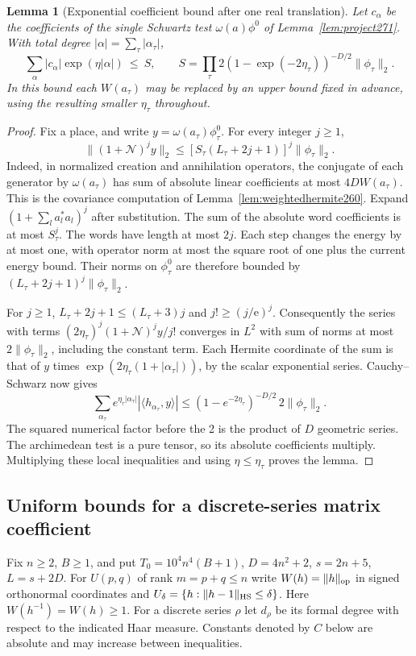 \documentclass[a4paper,11pt]{article}
\newtheorem{lemma}[proposition]{Lemma}
\theoremstyle{definition}
\theoremstyle{remark}
\numberwithin{equation}{section}
\begin{document}
\begin{lemma}[Exponential coefficient bound after one real translation]\leavevmode
\label{lem:moment271}
Let \(c_\alpha\) be the coefficients of the single Schwartz
test \(\omega(a)\phi^0\) of Lemma~\ref{lem:project271}.
With total degree \(|\alpha|=\sum_\tau|\alpha_\tau|\),
\[
       \sum_\alpha |c_\alpha|\exp(\eta|\alpha|)
       \ \le\ S,\qquad
       S=\prod_\tau
          2(1-\exp(-2\eta_\tau))^{-D/2}\|\phi_\tau\|_2 .
\]
In this bound each \(W(a_\tau)\) may be replaced by an upper
bound fixed in advance, using the resulting smaller
\(\eta_\tau\) throughout.
\end{lemma}
\begin{proof}
Fix a place, and write \(y=\omega(a_\tau)\phi^0_\tau\).
For every integer \(j\ge1\),
\[
       \|(1+\mathcal N)^j y\|_2
         \le [S_\tau(L_\tau+2j+1)]^j\|\phi_\tau\|_2 .
\]
Indeed, in normalized creation and annihilation operators,
the conjugate of each generator by \(\omega(a_\tau)\) has
sum of absolute linear coefficients at most \(4DW(a_\tau)\).
This is the covariance computation of
Lemma~\ref{lem:weightedhermite260}. Expand
\((1+\sum_l a_l^*a_l)^j\) after substitution. The sum of
the absolute word coefficients is at most \(S_\tau^j\).
The words have length at most \(2j\). Each step changes the
energy by at most one, with operator norm at most the square
root of one plus the current energy bound. Their norms on
\(\phi^0_\tau\) are therefore bounded by
\((L_\tau+2j+1)^j\|\phi_\tau\|_2\).

For \(j\ge1\), \(L_\tau+2j+1\le (L_\tau+3)j\) and
\(j!\ge(j/\mathrm e)^j\). Consequently the series with
terms \((2\eta_\tau)^j(1+\mathcal N)^j y/j!\) converges in
\(L^2\) with sum of norms at most \(2\|\phi_\tau\|_2\),
including the constant term. Each Hermite coordinate of
the sum is that of \(y\) times
\(\exp(2\eta_\tau(1+|\alpha_\tau|))\), by the scalar
exponential series. Cauchy--Schwarz now gives
\[
 \sum_{\alpha_\tau} e^{\eta_\tau|\alpha_\tau|}
                    |\langle h_{\alpha_\tau},y\rangle|
 \le (1-e^{-2\eta_\tau})^{-D/2}\,2\|\phi_\tau\|_2 .
\]
The squared numerical factor before the 2 is the product
of \(D\) geometric series. The archimedean test is a pure
tensor, so its absolute coefficients multiply. Multiplying
these local inequalities and using \(\eta\le\eta_\tau\)
proves the lemma.
\end{proof}

\subsection{Uniform bounds for a discrete-series matrix coefficient}\label{nav:VII-39}
Fix \(n\ge2\), \(B\ge1\), and put \(T_0=10^4 n^4(B+1)\),
\(D=4n^2+2\), \(s=2n+5\), \(L=s+2D\). For \(U(p,q)\) of rank
\(m=p+q\le n\) write \(W(h)=\|h\|_{\rm op}\) in signed orthonormal
coordinates and \(U_\delta=\{h:\|h-1\|_{\rm HS}\le\delta\}\).
Here \(W(h^{-1})=W(h)\ge1\). For a discrete series \(\rho\) let
\(d_\rho\) be its formal degree with respect to the indicated Haar
measure. Constants denoted by \(C\) below are absolute and may
increase between inequalities.
\end{document}
